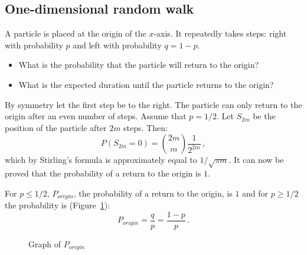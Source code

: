 \documentclass[11pt,a4paper]{article}
\newcommand*{\disfrac}[2]{\displaystyle\frac{#1}{#2}}
\newcommand*{\dischoose}[2]{\displaystyle{#1 \choose #2}}
\begin{document}
\subsection{One-dimensional random walk}

A particle is placed at the origin of the $x$-axis. It repeatedly takes steps: right with probability $p$ and left with probability $q=1-p$.
\begin{center}
\end{center}
\begin{itemize}
\item What is the probability that the particle will return to the origin?
\item What is the expected duration until the particle returns to the origin?
\end{itemize}

By symmetry let the first step be to the right. The particle can only return to the origin after an even number of steps. Assume that $p=1/2$. Let $S_{2m}$ be the position of the particle after $2m$ steps. Then:
\[
P(S_{2m}=0) = \dischoose{2m}{m}\disfrac{1}{2^{2m}}\,,
\]
which by Stirling's formula is approximately equal to $1/\sqrt{\pi m}$. It can now be proved that the probability of a return to the origin is $1$.

For $p\leq 1/2$, $P_{\mathit{origin}}$, the probability of a return to the origin, is $1$ and for $p\geq 1/2$ the probability is (Figure~\ref{f.walk1}):
\[
P_{\mathit{origin}} = \disfrac{q}{p}=\disfrac{1-p}{p}\,.
\]
\begin{figure}
\begin{center}
\caption{Graph of $P_{\mathit{origin}}$}\label{f.walk1}
\end{center}
\end{figure}
\end{document}
